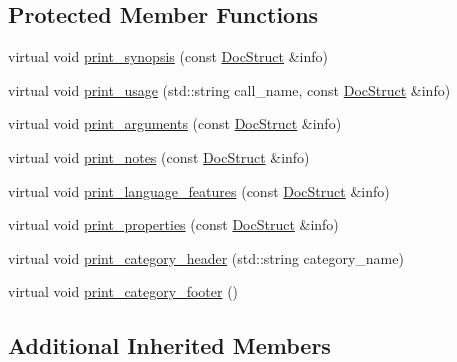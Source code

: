 \subsection*{Protected Member Functions}
\begin{DoxyCompactItemize}
\item 
virtual void \hyperlink{classTxt2TagsPrinter_a6bcc28d9a842cdb08f2f20b857480d7f}{print\-\_\-synopsis} (const \hyperlink{structDocStruct}{Doc\-Struct} \&info)
\item 
virtual void \hyperlink{classTxt2TagsPrinter_a1052b10fce569cf5a7dd8d2071e58987}{print\-\_\-usage} (std\-::string call\-\_\-name, const \hyperlink{structDocStruct}{Doc\-Struct} \&info)
\item 
virtual void \hyperlink{classTxt2TagsPrinter_a211dc59422b4a7bed65e27ac9e2aff11}{print\-\_\-arguments} (const \hyperlink{structDocStruct}{Doc\-Struct} \&info)
\item 
virtual void \hyperlink{classTxt2TagsPrinter_a2c966dac44b8926523a956c37b073870}{print\-\_\-notes} (const \hyperlink{structDocStruct}{Doc\-Struct} \&info)
\item 
virtual void \hyperlink{classTxt2TagsPrinter_a330214e600158887ef50f012523b8f32}{print\-\_\-language\-\_\-features} (const \hyperlink{structDocStruct}{Doc\-Struct} \&info)
\item 
virtual void \hyperlink{classTxt2TagsPrinter_abcf56c43f241406e207861f98c58fb3c}{print\-\_\-properties} (const \hyperlink{structDocStruct}{Doc\-Struct} \&info)
\item 
virtual void \hyperlink{classTxt2TagsPrinter_a272f9f74d06e9926b9de61c96e02ecd7}{print\-\_\-category\-\_\-header} (std\-::string category\-\_\-name)
\item 
virtual void \hyperlink{classTxt2TagsPrinter_ae937c09e8f3eeb2fb30c118facf60a7e}{print\-\_\-category\-\_\-footer} ()
\end{DoxyCompactItemize}
\subsection*{Additional Inherited Members}


